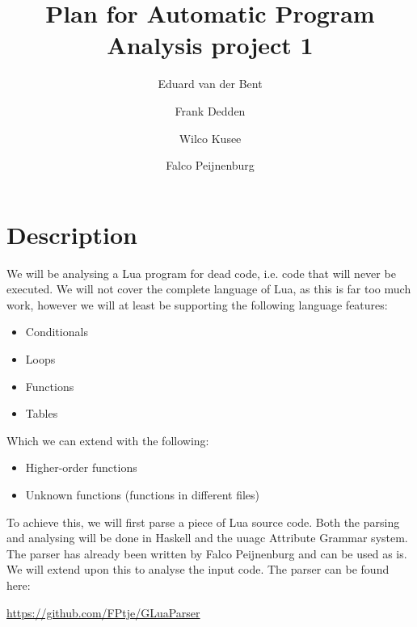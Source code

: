 \documentclass[10pt]{article}
\title{Plan for Automatic Program Analysis project 1}
\author{Eduard van der Bent \and Frank Dedden \and Wilco Kusee \and Falco Peijnenburg}
\begin{document}
\maketitle

\section*{Description}
We will be analysing a Lua program for dead code, i.e. code that will never be executed. We will not cover the complete language of Lua, as this is far too much work, however we will at least be supporting the following language features:
\begin{itemize}
	\item Conditionals
	\item Loops
	\item Functions
	\item Tables
\end{itemize}
Which we can extend with the following:
\begin{itemize}
	\item Higher-order functions
	\item Unknown functions (functions in different files)
\end{itemize}
To achieve this, we will first parse a piece of Lua source code. Both the parsing and analysing will be done in Haskell and the uuagc Attribute Grammar system. The parser has already been written by Falco Peijnenburg and can be used as is. We will extend upon this to analyse the input code. The parser can be found here:

\url{https://github.com/FPtje/GLuaParser}
\end{document}
